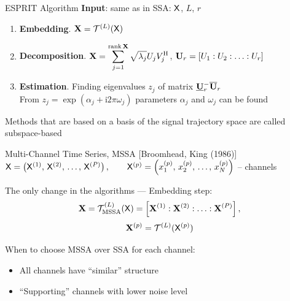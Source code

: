 \documentclass[pdf, unicode, ucs, notheorems]{beamer}
\theoremstyle{definition}
\begin{document}
\begin{frame}{ESPRIT Algorithm}
  \textbf{Input}: same as in SSA: $\mathsf{X}$, $L$, $r$
  \begin{enumerate}
    \item \textbf{Embedding}. $\mathbf{X} = \mathcal{T}^{(L)}(\mathsf{X})$
    \item \textbf{Decomposition}.
      $\displaystyle\mathbf{X} = \sum_{j=1}^{\operatorname{rank}\mathbf{X}}
      \sqrt{\lambda_j} U_j V_j^{\mathrm{H}}$,
      $\mathbf{U}_r = \left[U_1: U_2: \ldots: U_r\right]$
    \item \textbf{Estimation}. Finding eigenvalues $z_j$ of matrix
      $\underline{\mathbf{U}}_r^{-}\overline{\mathbf{U}}_r$ \\ \smallskip
      From $z_j = \exp(\alpha_j + \mathrm{i}2\pi\omega_j)$
      parameters $\alpha_j$ and $\omega_j$ can be found
  \end{enumerate}

  \bigskip

  Methods that are based on a basis of the signal trajectory space
  are called subspace-based
\end{frame}

\begin{frame}{Multi-Channel Time Series, MSSA}
  [Broomhead, King (1986)]\\ \smallskip
  $\mathsf{X} = \left(\mathsf{X}^{(1)},\, \mathsf{X}^{(2)}, \, \ldots,\,
  \mathsf{X}^{(P)}\right), \qquad\mathsf{X}^{(p)} = \left(x_1^{(p)}, \, x_2^{(p)},\,
  \ldots,\,  x_N^{(p)}\right)$ -- channels
  \vspace{0.4cm}

  The only change in the algorithms --- Embedding step:
  \[
    \mathbf{X} = \mathcal{T}_{\textrm{MSSA}}^{(L)}(\mathsf{X}) = \left[\mathbf{X}^{(1)} :
    \mathbf{X}^{(2)}: \ldots : \mathbf{X}^{(P)}\right],
  \]
  \[
    \mathbf{X}^{(p)} = \mathcal{T}^{(L)}(\mathsf{X}^{(p)})
  \]
  \vspace{0.4cm}

  When to choose MSSA over SSA for each channel:
  \begin{itemize}
    \item All channels have ``similar'' structure
    \item ``Supporting'' channels with lower noise level
  \end{itemize}
\end{frame}
\end{document}
